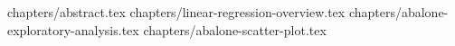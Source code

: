 \documentclass[a4paper,12pt]{article}
\begin{document}
 
 
 

\tableofcontents
\clearpage
{chapters/abstract.tex}
{chapters/linear-regression-overview.tex}
{chapters/abalone-exploratory-analysis.tex}
{chapters/abalone-scatter-plot.tex}
 


\end{document}
